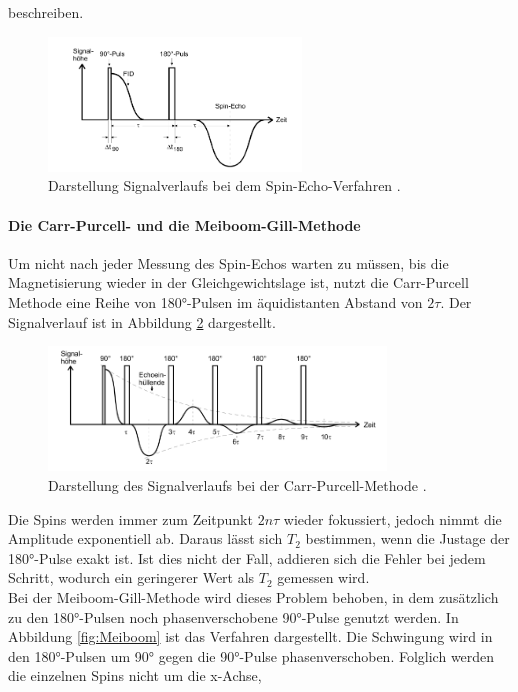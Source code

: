 beschreiben.
\begin{figure}[H]
  \centering
  \includegraphics[width=0.6\textwidth]{pics/Signalverlauf.png}
  \caption{Darstellung Signalverlaufs bei dem Spin-Echo-Verfahren \cite{Anleitung}.}
  \label{fig:Signal}
\end{figure}
\paragraph{Die Carr-Purcell- und die Meiboom-Gill-Methode}
Um nicht nach jeder Messung des Spin-Echos warten zu müssen, bis die Magnetisierung wieder
in der Gleichgewichtslage ist, nutzt die Carr-Purcell Methode eine Reihe von
180°-Pulsen im äquidistanten Abstand von $2\tau$. Der Signalverlauf ist in Abbildung
\ref{fig:CPM} dargestellt.
\begin{figure}[H]
  \centering
  \includegraphics[width=0.8\textwidth]{pics/CPM.png}
  \caption{Darstellung des Signalverlaufs bei der Carr-Purcell-Methode \cite{Anleitung}.}
  \label{fig:CPM}
\end{figure}
Die Spins werden immer zum Zeitpunkt $2n\tau$ wieder fokussiert,
jedoch nimmt die Amplitude exponentiell ab. Daraus lässt sich $T_2$ bestimmen, wenn
die Justage der 180°-Pulse exakt ist. Ist dies nicht der Fall, addieren sich die
Fehler bei jedem Schritt, wodurch ein geringerer Wert als $T_2$ gemessen wird.\\
Bei der Meiboom-Gill-Methode wird dieses Problem behoben, in dem zusätzlich zu den 180°-Pulsen
noch phasenverschobene 90°-Pulse genutzt werden. In Abbildung \ref{fig:Meiboom}
ist das Verfahren dargestellt. Die Schwingung wird in den 180°-Pulsen
um 90° gegen die 90°-Pulse phasenverschoben.
Folglich werden die einzelnen Spins nicht um die x-Achse,
